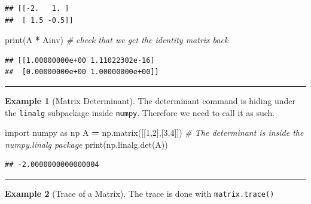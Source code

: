 \documentclass[
]{book}
\newenvironment{Shaded}{\begin{snugshade}}{\end{snugshade}}
\newcommand{\BuiltInTok}[1]{#1}
\newcommand{\CommentTok}[1]{\textcolor[rgb]{0.56,0.35,0.01}{\textit{#1}}}
\newcommand{\DecValTok}[1]{\textcolor[rgb]{0.00,0.00,0.81}{#1}}
\newcommand{\ImportTok}[1]{#1}
\newcommand{\NormalTok}[1]{#1}
\newcommand{\OperatorTok}[1]{\textcolor[rgb]{0.81,0.36,0.00}{\textbf{#1}}}
\theoremstyle{definition}
\theoremstyle{definition}
\newtheorem{example}{Example}[chapter]
\theoremstyle{definition}
\theoremstyle{remark}
\begin{document}
\begin{verbatim}
## [[-2.   1. ]
##  [ 1.5 -0.5]]
\end{verbatim}

\begin{Shaded}
\begin{Highlighting}[]
\BuiltInTok{print}\NormalTok{(A }\OperatorTok{*}\NormalTok{ Ainv) }\CommentTok{\# check that we get the identity matrix back}
\end{Highlighting}
\end{Shaded}

\begin{verbatim}
## [[1.00000000e+00 1.11022302e-16]
##  [0.00000000e+00 1.00000000e+00]]
\end{verbatim}

\begin{center}\rule{0.5\linewidth}{0.5pt}\end{center}

\begin{example}[Matrix Determinant]
\protect\hypertarget{exm:unnamed-chunk-733}{}{\label{exm:unnamed-chunk-733} {} }The determinant command is hiding under the \texttt{linalg} subpackage inside \texttt{numpy}. Therefore we need to call it as such.
\end{example}

\begin{Shaded}
\begin{Highlighting}[]
\ImportTok{import}\NormalTok{ numpy }\ImportTok{as}\NormalTok{ np}
\NormalTok{A }\OperatorTok{=}\NormalTok{ np.matrix([[}\DecValTok{1}\NormalTok{,}\DecValTok{2}\NormalTok{],[}\DecValTok{3}\NormalTok{,}\DecValTok{4}\NormalTok{]])}
\CommentTok{\# The determinant is inside the numpy.linalg package}
\BuiltInTok{print}\NormalTok{(np.linalg.det(A)) }
\end{Highlighting}
\end{Shaded}

\begin{verbatim}
## -2.0000000000000004
\end{verbatim}

\begin{center}\rule{0.5\linewidth}{0.5pt}\end{center}

\begin{example}[Trace of a Matrix]
\protect\hypertarget{exm:unnamed-chunk-735}{}{\label{exm:unnamed-chunk-735} {} }The trace is done with \texttt{matrix.trace()}
\end{example}
\end{document}
